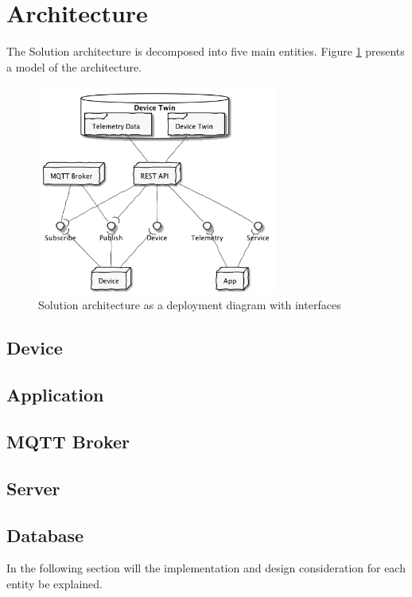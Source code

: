 \section{Architecture}

The Solution architecture is decomposed into five main entities. 
Figure \ref{fig:arc} presents a model of the architecture.

\begin{figure}[H]
    \centering
    \includegraphics[width=0.7\textwidth]{out/figures/uml/architecture/architecture.png}
    \caption{Solution architecture as a deployment diagram with interfaces}
    \label{fig:arc}
\end{figure}

\subsection{Device} 
\subsection{Application} 
\subsection{MQTT Broker} 
\subsection{Server} 
\subsection{Database} 

In the following section will the implementation and design consideration for each entity be explained. 